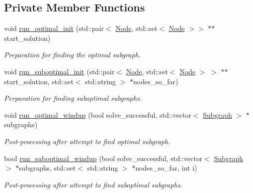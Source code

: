 \subsection*{Private Member Functions}
\begin{DoxyCompactItemize}
\item 
void \hyperlink{classderegnet_1_1DeregnetFinder_ae0335349d6a60ee204d10bf8b7366cfa}{run\+\_\+optimal\+\_\+init} (std\+::pair$<$ \hyperlink{namespacederegnet_a744bad34f2de9856d36715a445f027f3}{Node}, std\+::set$<$ \hyperlink{namespacederegnet_a744bad34f2de9856d36715a445f027f3}{Node} $>$$>$ $\ast$$\ast$start\+\_\+solution)
\begin{DoxyCompactList}\small\item\em Preparation for finding the optimal subgraph. \end{DoxyCompactList}\item 
void \hyperlink{classderegnet_1_1DeregnetFinder_ad996cee997a5db4e09016a6f725a6701}{run\+\_\+suboptimal\+\_\+init} (std\+::pair$<$ \hyperlink{namespacederegnet_a744bad34f2de9856d36715a445f027f3}{Node}, std\+::set$<$ \hyperlink{namespacederegnet_a744bad34f2de9856d36715a445f027f3}{Node} $>$ $>$ $\ast$$\ast$start\+\_\+solution, std\+::set$<$ std\+::string $>$ $\ast$nodes\+\_\+so\+\_\+far)
\begin{DoxyCompactList}\small\item\em Perparation for finding suboptimal subgraphs. \end{DoxyCompactList}\item 
void \hyperlink{classderegnet_1_1DeregnetFinder_a92610c1444ba271820e64d224ec64bb7}{run\+\_\+optimal\+\_\+windup} (bool solve\+\_\+successful, std\+::vector$<$ \hyperlink{structderegnet_1_1Subgraph}{Subgraph} $>$ $\ast$subgraphs)
\begin{DoxyCompactList}\small\item\em Post-\/processing after attempt to find optimal subgraph. \end{DoxyCompactList}\item 
bool \hyperlink{classderegnet_1_1DeregnetFinder_a4021d92d787877187a24dcbaf0c1bad1}{run\+\_\+suboptimal\+\_\+windup} (bool solve\+\_\+successful, std\+::vector$<$ \hyperlink{structderegnet_1_1Subgraph}{Subgraph} $>$ $\ast$subgraphs, std\+::set$<$ std\+::string $>$ $\ast$nodes\+\_\+so\+\_\+far, int i)
\begin{DoxyCompactList}\small\item\em Post-\/processing after attempt to find suboptimal subgraphs. \end{DoxyCompactList}\end{DoxyCompactItemize}

